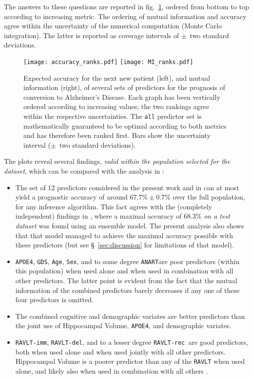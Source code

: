 \documentclass[utf8]{FrontiersinHarvard} %
\newcommand*{\sect}{\S}%
\newcommand*{\fig}{fig.}%
\renewcommand*{\|}[1][]{\nonscript\:#1\vert\nonscript\:\mathopen{}}
\newcommand*{\age}{\texttt{Age}}
\newcommand*{\sex}{\texttt{Sex}}
\newcommand*{\apoe}{\texttt{APOE4}}
\newcommand*{\anart}{\texttt{ANART}}
\newcommand*{\gds}{\texttt{GDS}}
\newcommand*{\ravltimm}{\texttt{RAVLT-imm}}
\newcommand*{\ravltdel}{\texttt{RAVLT-del}}
\newcommand*{\ravltrec}{\texttt{RAVLT-rec}}
\newcommand*{\ad}{Alzheimer's Disease}
\begin{document}
The answers to these questions are reported in \fig~\ref{fig:mutual_info}, ordered from bottom to top according to increasing metric. The ordering of mutual information and accuracy agree within the uncertainty of the numerical computation (Monte Carlo integration). The latter is reported as coverage intervals of $\pm$~two standard deviations.
\begin{figure}[b]%
  \centering%
\texttt{[image: accuracy\_ranks.pdf]}%
\hfill%
\texttt{[image: MI\_ranks.pdf]}%
\caption{Expected accuracy for the next new patient (left), and mutual information (right), of several sets of predictors for the prognosis of conversion to \ad. Each graph has been vertically ordered according to increasing values; the two rankings agree within the respective uncertainties. The \texttt{all} predictor set is mathematically guaranteed to be optimal according to both metrics and has therefore been ranked first. Bars show the uncertainty interval ($\pm$~two standard deviations).}\label{fig:mutual_info}
\end{figure}%


The plots reveal several findings, \emph{valid within the population selected for the dataset}, which can be compared with the analysis in \citet[see especially Fig.~3 and Table~3]{ryeetal2022}:
\begin{itemize}
\item The set of 12 predictors considered in the present work and in \citet{ryeetal2022} can at most yield a prognostic accuracy of around $67.7\%\pm0.7\%$ over the full population, for any inference algorithm. This fact agrees with the (completely independent) findings in \citet{ryeetal2022}, where a maximal accuracy of 68.3\% \emph{on a test dataset} was found using an ensemble model. The present analysis also shows that that model managed to achieve the maximal accuracy possible with these predictors (but see \sect~\ref{sec:discussion} for limitations of that model).

\item \apoe, \gds, \age, \sex, and to some degree \anart are poor predictors (within this population) when used alone and when used in combination with all other predictors. The latter point is evident from the fact that the mutual information of the combined predictors barely decreases if any one of these four predictors is omitted.

\item The combined cognitive and demographic variates are better predictors than the joint use of Hippocampal Volume, \apoe, and demographic variates.

\item \ravltimm, \ravltdel, and to a lesser degree \ravltrec\ are good predictors, both when used alone and when used jointly with all other predictors. Hippocampal Volume is a poorer predictor than any of the \texttt{RAVLT} when used alone, and likely also when used in combination with all others \citep[contrast this with][]{ryeetal2022}.
\end{itemize}
\end{document}
